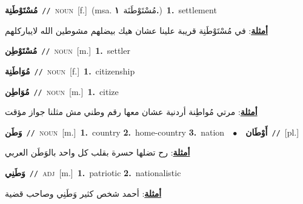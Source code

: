 \documentclass[10pt,a4paper,twoside]{article} %
\begin{document}
\begin{multicols}{2}
{\setlength\topsep{0pt}\textbf{\foreignlanguage{arabic}{مُسْتَوْطَنِة}}\ {\color{gray}\texttt{//}\color{black}}\ \textsc{noun}\ [f.]\ \color{gray}(msa. \foreignlanguage{arabic}{مُسْتَوْطَنَة}~\foreignlanguage{arabic}{\textbf{١.}})\color{black}\ \textbf{1.}~settlement\  \begin{flushright}\color{gray}\foreignlanguage{arabic}{\textbf{\underline{\foreignlanguage{arabic}{أمثلة}}}: في مُسْتَوْطَنِة قريبة علينا عشان هيك بيضلهم مشوطين الله لايباركلهم}\end{flushright}\color{black}} \vspace{2mm}

{\setlength\topsep{0pt}\textbf{\foreignlanguage{arabic}{مُسْتَوْطِن}}\ {\color{gray}\texttt{//}\color{black}}\ \textsc{noun}\ [m.]\ \textbf{1.}~settler\ } \vspace{2mm}

{\setlength\topsep{0pt}\textbf{\foreignlanguage{arabic}{مُوَاطَنِة}}\ {\color{gray}\texttt{//}\color{black}}\ \textsc{noun}\ [f.]\ \textbf{1.}~citizenship\ } \vspace{2mm}

{\setlength\topsep{0pt}\textbf{\foreignlanguage{arabic}{مُوَاطِن}}\ {\color{gray}\texttt{//}\color{black}}\ \textsc{noun}\ [m.]\ \textbf{1.}~citize\  \begin{flushright}\color{gray}\foreignlanguage{arabic}{\textbf{\underline{\foreignlanguage{arabic}{أمثلة}}}: مرتي مُواطِنة أردنية عشان معها رقم وطني مش مثلنا جواز مؤقت}\end{flushright}\color{black}} \vspace{2mm}

{\setlength\topsep{0pt}\textbf{\foreignlanguage{arabic}{وَطَن}}\ {\color{gray}\texttt{//}\color{black}}\ \textsc{noun}\ [m.]\ \textbf{1.}~country  \textbf{2.}~home-country  \textbf{3.}~nation\ \ $\bullet$\ \ \setlength\topsep{0pt}\textbf{\foreignlanguage{arabic}{أَوْطَان}}\ {\color{gray}\texttt{//}\color{black}}\ [pl.]\  \begin{flushright}\color{gray}\foreignlanguage{arabic}{\textbf{\underline{\foreignlanguage{arabic}{أمثلة}}}: رح تضلها حسرة بقلب كل واحد بالوَطَن العربي}\end{flushright}\color{black}} \vspace{2mm}

{\setlength\topsep{0pt}\textbf{\foreignlanguage{arabic}{وَطَنِي}}\ {\color{gray}\texttt{//}\color{black}}\ \textsc{adj}\ [m.]\ \textbf{1.}~patriotic  \textbf{2.}~nationalistic\  \begin{flushright}\color{gray}\foreignlanguage{arabic}{\textbf{\underline{\foreignlanguage{arabic}{أمثلة}}}: أحمد شخص كثير وَطَنِي وصاحب قضية}\end{flushright}\color{black}} \vspace{2mm}


\end{multicols}
\end{document}
